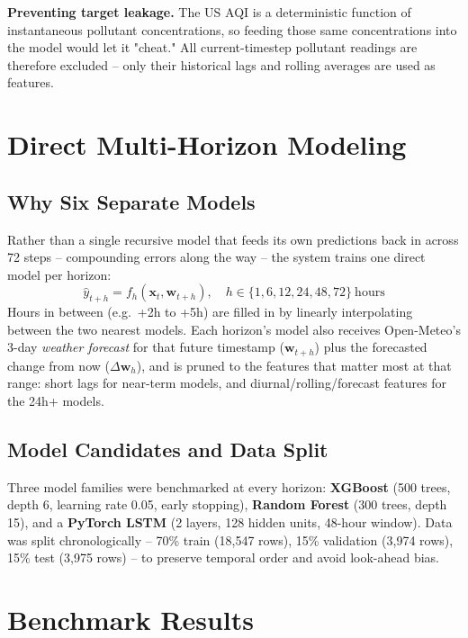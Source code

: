 \documentclass[12pt, a4paper]{article}
\begin{document}
\textbf{Preventing target leakage.} The US AQI is a deterministic function of instantaneous pollutant concentrations, so feeding those same concentrations into the model would let it "cheat." All current-timestep pollutant readings are therefore excluded -- only their historical lags and rolling averages are used as features.


\section{Direct Multi-Horizon Modeling}
\label{sec:modeling}

\subsection{Why Six Separate Models}
Rather than a single recursive model that feeds its own predictions back in across 72 steps -- compounding errors along the way -- the system trains one direct model per horizon:
\begin{equation}
  \hat{y}_{t+h} = f_h(\mathbf{x}_t, \mathbf{w}_{t+h}), \quad h \in \{1, 6, 12, 24, 48, 72\}\ \text{hours}
\end{equation}
Hours in between (e.g.\ +2h to +5h) are filled in by linearly interpolating between the two nearest models. Each horizon's model also receives Open-Meteo's 3-day \emph{weather forecast} for that future timestamp ($\mathbf{w}_{t+h}$) plus the forecasted change from now ($\Delta\mathbf{w}_h$), and is pruned to the features that matter most at that range: short lags for near-term models, and diurnal/rolling/forecast features for the 24h+ models.

\subsection{Model Candidates and Data Split}
Three model families were benchmarked at every horizon: \textbf{XGBoost} (500 trees, depth 6, learning rate 0.05, early stopping), \textbf{Random Forest} (300 trees, depth 15), and a \textbf{PyTorch LSTM} (2 layers, 128 hidden units, 48-hour window). Data was split chronologically -- 70\% train (18,547 rows), 15\% validation (3,974 rows), 15\% test (3,975 rows) -- to preserve temporal order and avoid look-ahead bias.


\section{Benchmark Results}
\label{sec:results}
\end{document}

